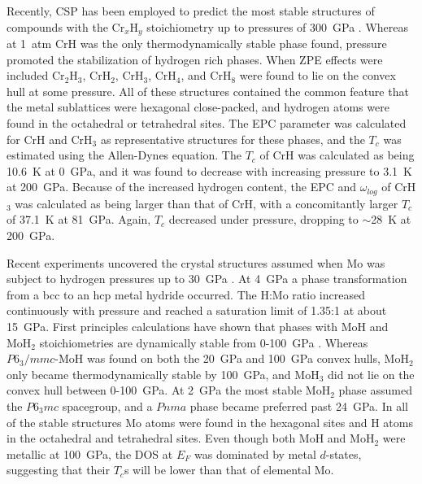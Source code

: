 \documentclass[12pt,letterpaper,oneside]{article}
\begin{document}
Recently, CSP has been employed to predict the most stable structures of compounds with the Cr$_x$H$_y$ stoichiometry up to pressures of 300~GPa \cite{Yu:2015}. Whereas at 1~atm CrH was the only thermodynamically stable phase found, pressure promoted the stabilization of hydrogen rich phases. When ZPE effects were included Cr$_2$H$_3$, CrH$_2$, CrH$_3$, CrH$_4$, and CrH$_8$ were found to lie on the convex hull at some pressure. All of these structures contained the common feature that the metal sublattices were hexagonal close-packed, and hydrogen atoms were found in the octahedral or tetrahedral sites. The EPC parameter was calculated for CrH and CrH$_3$ as representative structures for these phases, and the $T_c$ was estimated using the Allen-Dynes equation. The $T_c$ of CrH was calculated as being 10.6~K at 0~GPa, and it was found to decrease with increasing pressure to 3.1~K at 200~GPa. Because of the increased hydrogen content, the EPC and $\omega_{log}$ of CrH$_3$ was calculated as being larger than that of CrH, with a concomitantly larger $T_c$ of 37.1~K at 81~GPa. Again, $T_c$ decreased under pressure, dropping to $\sim$28~K at 200~GPa. 

Recent experiments uncovered the crystal structures assumed when Mo was subject to hydrogen pressures up to 30~GPa \cite{Kuzovnikov:2017}. At 4~GPa a phase transformation from a bcc to an hcp metal hydride occurred. The H:Mo ratio increased continuously with pressure and reached a saturation limit of 1.35:1 at about 15~GPa. First principles calculations have shown that phases with MoH and MoH$_2$ stoichiometries are dynamically stable from 0-100~GPa \cite{Feng:2016}. Whereas $P6_3/mmc$-MoH was found on both the 20~GPa and 100~GPa convex hulls, MoH$_2$ only became thermodynamically stable by 100~GPa, and MoH$_3$ did not lie on the convex hull between 0-100~GPa. At 2~GPa the most stable MoH$_2$ phase assumed the $P6_3mc$ spacegroup, and a $Pnma$ phase became preferred past 24~GPa. In all of the stable structures Mo atoms were found in the hexagonal sites and H atoms in the octahedral and tetrahedral sites. Even though both MoH and MoH$_2$ were metallic at 100~GPa, the DOS at $E_F$ was dominated by metal $d$-states, suggesting that their $T_c$s will be lower than that of elemental Mo.
\end{document}
